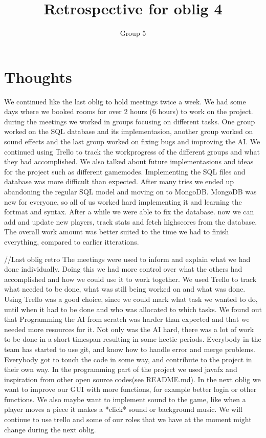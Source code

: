 \documentclass{article}
\title{Retrospective for oblig 4}
\author{Group 5}
\date{}
\begin{document}
    \maketitle

    \section{Thoughts}
    \noindent
     We continued like the last oblig to hold meetings twice a week. We had some days where we booked rooms for over 2 hours (6 hours) to work on the project.
     during the meetings we worked in groups focusing on different tasks. One group worked on the SQL database and its implementasion, another group worked on sound effects
     and the last group worked on fixing bugs and improving the AI. We continued using Trello to track the workprogress of the different groups and what they had accomplished.
     We also talked about future implementasions and ideas for the project such as different gamemodes.
     Implementing the SQL files and database was more difficult than expected.
     After many tries we ended up abandoning the regular SQL model and moving on to MongoDB. MongoDB was new for everyone, so all of us worked hard
     implementing it and learning the fortmat and syntax. After a while we were able to fix the database. now we can add and update new players, track
     stats and fetch highscores from the database.
     The overall work amount was better suited to the time we had to finish everything, compared to earlier itterations.





     //Last oblig retro
      The meetings were used to inform and explain what we had
     done individually. Doing this we had more control over what the others had accomplished and how we could use it to work together.
     We used Trello to track what needed to be done, what was still being worked on and what was done. Using Trello was a good choice, since we could mark what task we
     wanted to do, until when it had to be done and who was allocated to which tasks. We found out that Programming the AI from scratch was harder than expected
     and that we needed more resources for it. Not only was the AI hard, there was a lot of work to be done in a short timespan
     resulting in some hectic periods. Everybody in the team has started to use git, and know how to handle error and merge problems.
     Everybody got to touch the code in some way, and contribute to the project in their own way. In the programming part of the project
     we used javafx and inspiration from other open source codes(see README.md). In the next oblig we want to
     improve our GUI with more functions, for example better login or other functions. We also maybe want to implement sound to the game, like when a player moves a piece it makes a *click* sound or background music. We will continue to use trello and some of our roles that we have at the moment might change during the next oblig.
\end{document}
